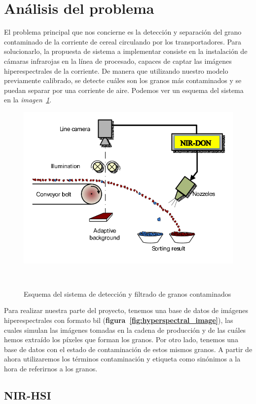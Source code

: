 \section{Análisis del problema}

El problema principal que nos concierne es la detección y separación del grano contaminado de la corriente de cereal circulando por los transportadores. Para solucionarlo,
la propuesta de sistema a implementar consiste en la instalación de cámaras infrarojas en la línea de procesado, capaces de captar las imágenes hiperespectrales de la
corriente. De manera que utilizando nuestro modelo previamente calibrado, se detecte cuáles son los granos más contaminados y se puedan separar por una corriente de aire. 
Podemos ver un esquema del sistema en la \textit{imagen\ \ref{fig:detection-system}}.

\begin{figure}
    \centering
    \includegraphics[width=0.7\linewidth]{media/images/esquema-del-sistema.png}
    \caption{Esquema del sistema de detección y filtrado de granos contaminados}\ \label{fig:detection-system}
\end{figure}

Para realizar nuestra parte del proyecto, tenemos una base de datos de imágenes hiperespectrales con formato \acrshort{bil} (\textbf{figura\ \ref{fig:hyperspectral_image}}), 
las cuales simulan las imágenes tomadas en la cadena de producción y de las cuáles hemos extraído los píxeles que forman los granos.
Por otro lado, tenemos una base de datos con el estado de contaminación de estos mismos granos. A partir de ahora utilizaremos los términos contaminación y etiqueta como 
sinónimos a la hora de referirnos a los granos.


\subsection{NIR-HSI}

